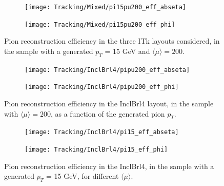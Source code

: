 \documentclass[a4paper,twoside,12pt]{book}
\begin{document}
\begin{figure}
\begin{subfigure}{.5\linewidth}
\centering
\texttt{[image: Tracking/Mixed/pi15pu200\_eff\_abseta]}
\caption{} 
\label{fig:tracking:pi15pu200_eff_abseta}
\end{subfigure}
\begin{subfigure}{.5\linewidth}
\centering
\texttt{[image: Tracking/Mixed/pi15pu200\_eff\_phi]}
\caption{} 
\label{fig:tracking:pi15pu200_eff_phi}
\end{subfigure}
\caption{Pion reconstruction efficiency in the three ITk layouts considered, in the sample with a generated $p_{T}$ = 15 GeV and $\langle\mu\rangle = 200$.}
\label{fig:tracking:effLayout}
\end{figure}

\begin{figure}
\begin{subfigure}{.5\linewidth}
\centering
\texttt{[image: Tracking/InclBrl4/pipu200\_eff\_abseta]}
\caption{} 
\label{fig:tracking:pipu200_eff_abseta}
\end{subfigure}
\begin{subfigure}{.5\linewidth}
\centering
\texttt{[image: Tracking/InclBrl4/pipu200\_eff\_phi]}
\caption{} 
\label{fig:tracking:pipu200_eff_phi}
\end{subfigure}
\caption{Pion reconstruction efficiency in the InclBrl4 layout, in the sample with $\langle\mu\rangle = 200$, as a function of the generated pion $p_{T}$.}
\label{fig:tracking:effPt}
\end{figure}

\begin{figure}
\begin{subfigure}{.5\linewidth}
\centering
\texttt{[image: Tracking/InclBrl4/pi15\_eff\_abseta]}
\caption{} 
\label{fig:tracking:pi15_eff_abseta}
\end{subfigure}
\begin{subfigure}{.5\linewidth}
\centering
\texttt{[image: Tracking/InclBrl4/pi15\_eff\_phi]}
\caption{} 
\label{fig:tracking:pi15_eff_phi}
\end{subfigure}
\caption{Pion reconstruction efficiency in the InclBrl4, in the sample with a generated $p_{T}$ = 15 GeV, for different $\langle\mu\rangle$.}
\label{fig:tracking:effPileup}
\end{figure}
\end{document}
